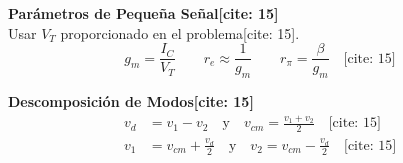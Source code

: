\documentclass[10pt, a4paper]{article}
\begin{document}
\vspace{0.3cm}
\noindent\begin{minipage}[t]{0.48\textwidth}
    \textbf{Parámetros de Pequeña Señal[cite: 15]}\\
    Usar $V_T$ proporcionado en el problema[cite: 15].
    \begin{equation*}
        g_m = \frac{I_C}{V_T} \qquad r_e \approx \frac{1}{g_m} \qquad r_\pi = \frac{\beta}{g_m} \quad \text{[cite: 15]}
    \end{equation*}
\end{minipage}\hfill
\begin{minipage}[t]{0.48\textwidth}
    \textbf{Descomposición de Modos[cite: 15]}\\
    \begin{align*}
        v_d &= v_1 - v_2 \quad \text{y} \quad v_{cm} = \frac{v_1 + v_2}{2} \quad \text{[cite: 15]} \\
        v_1 &= v_{cm} + \frac{v_d}{2} \quad \text{y} \quad v_2 = v_{cm} - \frac{v_d}{2} \quad \text{[cite: 15]}
    \end{align*}
\end{minipage}
\end{document}
